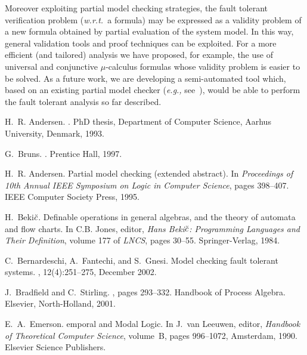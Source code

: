 \documentclass{entcs}
\newcommand{\eg}{\emph{e.g., }}
\newcommand{\wrt}{\emph{w.r.t.~}}
\begin{document}
Moreover exploiting partial model checking strategies, the fault
tolerant verification problem (\wrt a formula) may be expressed as a
validity problem of a new formula obtained by partial evaluation of
the system model. In this way, general validation tools and proof
techniques can be exploited. For a more efficient (and tailored)
analysis we have proposed, for example, the use of universal and
conjunctive $\mu$-calculus formulas whose validity problem is easier
to be solved.  As a future work, we are developing a semi-automated
tool which, based on an existing partial model checker (\eg
see~\cite{nielsen}), would be able to perform the fault tolerant
analysis so far described.

\begin{thebibliography}{10}

 H.~R. Andersen.  .  \newblock PhD thesis, Department of
  Computer Science, Aarhus University, Denmark, 1993.

 G.~Bruns.
.
\newblock Prentice Hall, 1997.

 H.~R. Andersen.  \newblock Partial model checking
  (extended abstract).  \newblock In {\em Proceedings of 10th Annual
  {IEEE} Symposium on Logic in Computer Science}, pages 398--407. IEEE
  Computer Society Press, 1995.

 H.~Beki$\breve{{\rm c}}$.  \newblock Definable operations in
  general algebras, and the theory of automata and flow charts.  \newblock In
  C.B. Jones, editor, {\em Hans Beki$\breve{{\rm c}}$: Programming Languages
    and Their Definition}, volume 177 of {\em LNCS}, pages 30--55.
  Springer-Verlag, 1984.

 C.~Bernardeschi, A.~Fantechi, and S.~Gnesi.  \newblock
  Model checking fault tolerant systems.  , 12(4):251--275, December 2002.

 J.~Bradfield and C.~Stirling.  , pages 293--332.  \newblock Handbook of
  Process Algebra. Elsevier, North-Holland, 2001.

 {E.~A.~Emerson}.  emporal and {M}odal {L}ogic.
  \newblock In {J.~van Leeuwen}, editor, {\em Handbook of Theoretical Computer
    Science}, volume~B, pages 996--1072, Amsterdam, 1990. Elsevier Science
  Publishers.


\end{thebibliography}
\end{document}

